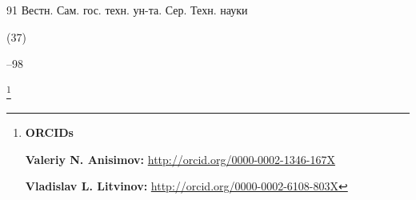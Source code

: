 \begin{thebibliography}{91}
\jour Вестн. Сам. гос. техн. ун-та. Сер. Техн. науки


(37)

--98











\end{thebibliography}

\RuDate





\newpage



\makeentitle







\thanks{{\bf ORCIDs}



{\bf Valeriy N. Anisimov:} \url{http://orcid.org/0000-0002-1346-167X}



{\bf Vladislav L. Litvinov:} \url{http://orcid.org/0000-0002-6108-803X}



}





\pagebreak



\EngRef





